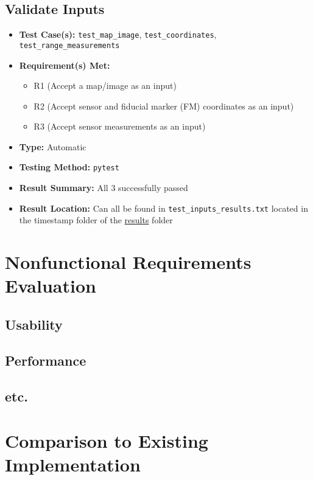 \documentclass[12pt, titlepage]{article}
\begin{document}
\subsection{Validate Inputs}
\begin{itemize}
  \item \textbf{Test Case(s): }\texttt{test\_map\_image}, \texttt{test\_coordinates}, \texttt{test\_range\_measurements}
  \item \textbf{Requirement(s) Met: }
  \begin{itemize}
    \item R1 (Accept a map/image as an input)
    \item R2 (Accept sensor and fiducial marker (FM) coordinates as an input)
    \item R3 (Accept sensor measurements as an input)
  \end{itemize}
  \item \textbf{Type: }Automatic
  \item \textbf{Testing Method: }\texttt{pytest}
  \item \textbf{Result Summary: }All 3 successfully passed
  \item \textbf{Result Location: }Can all be found in \texttt{test\_inputs\_results.txt} located in the timestamp folder of the \hyperlink{target name}{results} folder
\end{itemize}


\section{Nonfunctional Requirements Evaluation}

\subsection{Usability}
		
\subsection{Performance}

\subsection{etc.}
	
\section{Comparison to Existing Implementation}	
\end{document}
